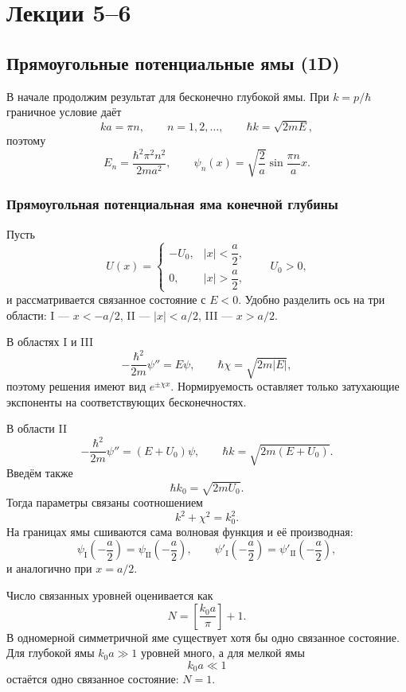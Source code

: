 \documentclass[12pt,a4paper]{article}
\begin{document}
\section{Лекции 5--6}

\subsection{Прямоугольные потенциальные ямы (1D)}

В начале продолжим результат для бесконечно глубокой ямы. При
$k=p/\hbar$ граничное условие даёт
\[
    ka=\pi n,
    \qquad n=1,2,\ldots,
    \qquad
    \hbar k=\sqrt{2mE},
\]
поэтому
\[
    E_n=\frac{\hbar^2\pi^2n^2}{2ma^2},
    \qquad
    \psi_n(x)=\sqrt{\frac{2}{a}}\sin\frac{\pi n}{a}x.
\]

\subsubsection{Прямоугольная потенциальная яма конечной глубины}

Пусть
\[
    U(x)=
    \begin{cases}
        -U_0, & |x|<\dfrac a2,\\
        0, & |x|>\dfrac a2,
    \end{cases}
    \qquad U_0>0,
\]
и рассматривается связанное состояние с $E<0$. Удобно разделить ось на
три области: I --- $x<-a/2$, II --- $|x|<a/2$, III --- $x>a/2$.

В областях I и III
\[
    -\frac{\hbar^2}{2m}\psi''=E\psi,
    \qquad
    \hbar\chi=\sqrt{2m|E|},
\]
поэтому решения имеют вид $e^{\pm\chi x}$. Нормируемость оставляет только
затухающие экспоненты на соответствующих бесконечностях.

В области II
\[
    -\frac{\hbar^2}{2m}\psi''=(E+U_0)\psi,
    \qquad
    \hbar k=\sqrt{2m(E+U_0)}.
\]
Введём также
\[
    \hbar k_0=\sqrt{2mU_0}.
\]
Тогда параметры связаны соотношением
\[
    \boxed{k^2+\chi^2=k_0^2}.
\]
На границах ямы сшиваются сама волновая функция и её производная:
\[
    \psi_{\mathrm I}\!\left(-\frac a2\right)
    =\psi_{\mathrm{II}}\!\left(-\frac a2\right),
    \qquad
    \psi'_{\mathrm I}\!\left(-\frac a2\right)
    =\psi'_{\mathrm{II}}\!\left(-\frac a2\right),
\]
и аналогично при $x=a/2$.

Число связанных уровней оценивается как
\[
    \boxed{N=\left[\frac{k_0a}{\pi}\right]+1}.
\]
В одномерной симметричной яме существует хотя бы одно связанное состояние.
Для глубокой ямы $k_0a\gg1$ уровней много, а для мелкой ямы
\[
    k_0a\ll1
\]
остаётся одно связанное состояние: $N=1$.
\end{document}
